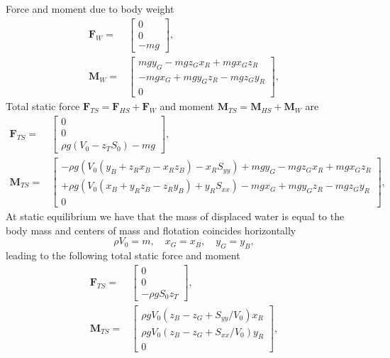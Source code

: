 \documentclass[]{book}
\newcommand{\V}[1]{\boldsymbol{#1}}
\begin{document}
Force and moment due to body weight
\begin{align}
\V{F}_{W}=& 
\begin{bmatrix}
0\\0\\-mg
\end{bmatrix},  \\
\V{M}_{W} =&
\begin{bmatrix}
 mgy_G - mgz_Gx_R + mgx_Gz_R\\
-mgx_G + mgy_Gz_R - mgz_Gy_R \\
0
\end{bmatrix}, 
\end{align}	
Total static force $\V{F}_{TS}= \V{F}_{HS} + \V{F}_{W}$ and moment $\V{M}_{TS}= \V{M}_{HS} + \V{M}_{W}$ are
\begin{align}
\V{F}_{TS}=& 
\begin{bmatrix}
0\\0\\\rho g\left( V_0 
- z_T S_0\right)-mg
\end{bmatrix},  \\
\V{M}_{TS} =&
\begin{bmatrix}
- \rho g \left( V_0 (y_B +  z_R x_B - x_R z_B ) - x_R S_{yy} \right) + mgy_G - mgz_Gx_R + mgx_Gz_R\\
+ \rho g \left( V_0 (x_B + y_R  z_B - z_R  y_B) + y_R S_{xx} \right) - mgx_G + mgy_Gz_R - mgz_Gy_R\\
0
\end{bmatrix}, 
\end{align}	
At static equilibrium we have that the mass of displaced water is equal to the body mass and centers of mass and flotation coincides horizontally
\begin{equation}
	\rho V_0 = m, \quad x_G = x_B, \quad y_G = y_B,
\end{equation}
leading to the following total static force and moment
\begin{align}
\V{F}_{TS}=& 
\begin{bmatrix}
0\\
0\\
-\rho g  S_0z_T
\end{bmatrix},  \\
\V{M}_{TS} =&
\begin{bmatrix}
 \rho g V_0 \left( z_B  - z_G  + S_{yy}/ V_0 \right)x_R   \\
 \rho g V_0 \left( z_B  - z_G +  S_{xx}/ V_0 \right)y_R  \\
0
\end{bmatrix}, 
\end{align}	
\end{document}
